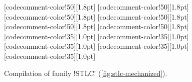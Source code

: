 \begin{figure}
\begin{minipage}{\textwidth}
\begin{multicols}{2}
[codecomment-color!50][1.8pt]
[codecomment-color!50][1.8pt]
[codecomment-color!50][1.8pt]
[codecomment-color!50][1.8pt]
[codecomment-color!50][1.8pt]
[codecomment-color!50][1.8pt]
[codecomment-color!35][1.0pt]
[codecomment-color!35][1.0pt]
[codecomment-color!35][1.0pt]
[codecomment-color!35][1.0pt]
[codecomment-color!35][1.0pt]

\end{multicols}
\end{minipage}

\vspace{-14pt}

\caption{Compilation of family \lsti!STLC! (\cref{fig:stlc-mechanized}).}
\label{fig:stlc-compiled}
\end{figure}